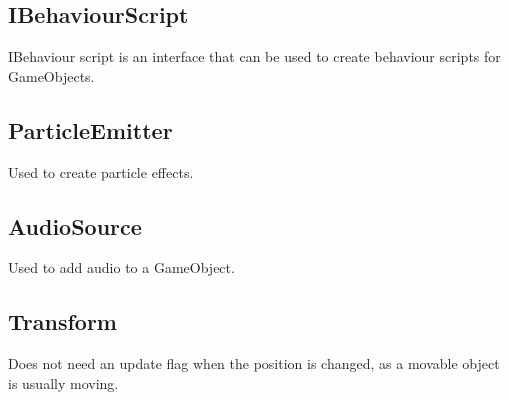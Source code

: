 \subsection{IBehaviourScript}
IBehaviour script is an interface that can be used to create behaviour scripts for GameObjects.

\subsection{ParticleEmitter}
Used to create particle effects.

\subsection{AudioSource}
Used to add audio to a GameObject.
\subsection{Transform}

Does not need an update flag when the position is changed, as a movable object is usually moving.



